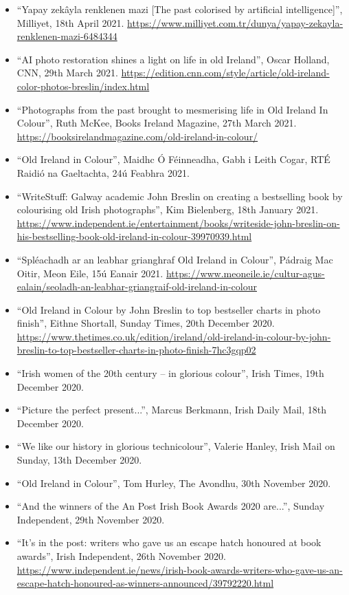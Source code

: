 \documentclass[10pt,a4paper]{res} %
\begin{document}
\begin{resume}
{\begin{itemize}
\item ``Yapay zek\^{a}yla renklenen mazi [The past colorised by artificial intelligence]'', Milliyet, 18th April 2021. \url{https://www.milliyet.com.tr/dunya/yapay-zekayla-renklenen-mazi-6484344}
\item ``AI photo restoration shines a light on life in old Ireland'', Oscar Holland, CNN, 29th March 2021. \url{https://edition.cnn.com/style/article/old-ireland-color-photos-breslin/index.html}
\item ``Photographs from the past brought to mesmerising life in Old Ireland In Colour'', Ruth McKee, Books Ireland Magazine, 27th March 2021. \url{https://booksirelandmagazine.com/old-ireland-in-colour/}
\item ``Old Ireland in Colour'', Maidhc \'{O} F\'{e}inneadha, Gabh i Leith Cogar, RT\'{E} Raidi\'{o} na Gaeltachta, 24\'{u} Feabhra 2021.
\item ``WriteStuff: Galway academic John Breslin on creating a bestselling book by colourising old Irish photographs'', Kim Bielenberg, 18th January 2021. \url{https://www.independent.ie/entertainment/books/writeside-john-breslin-on-his-bestselling-book-old-ireland-in-colour-39970939.html}
\item ``Spl\'{e}achadh ar an leabhar grianghraf Old Ireland in Colour'', P\'{a}draig Mac Oitir, Meon Eile, 15\'{u} Eanair 2021. \url{https://www.meoneile.ie/cultur-agus-ealain/seoladh-an-leabhar-griangraif-old-ireland-in-colour}
\item ``Old Ireland in Colour by John Breslin to top bestseller charts in photo finish'', Eithne Shortall, Sunday Times, 20th December 2020. \url{https://www.thetimes.co.uk/edition/ireland/old-ireland-in-colour-by-john-breslin-to-top-bestseller-charts-in-photo-finish-7hc3gqp02}
\item ``Irish women of the 20th century – in glorious colour'', Irish Times, 19th December 2020.
\item ``Picture the perfect present...'', Marcus Berkmann, Irish Daily Mail, 18th December 2020.
\item ``We like our history in glorious technicolour'', Valerie Hanley, Irish Mail on Sunday, 13th December 2020.
\item ``Old Ireland in Colour'', Tom Hurley, The Avondhu, 30th November 2020.
\item ``And the winners of the An Post Irish Book Awards 2020 are...'', Sunday Independent, 29th November 2020.
\item ``It's in the post: writers who gave us an escape hatch honoured at book awards'', Irish Independent, 26th November 2020. \url{https://www.independent.ie/news/irish-book-awards-writers-who-gave-us-an-escape-hatch-honoured-as-winners-announced/39792220.html}

\end{itemize}}
\end{resume}
\end{document}

